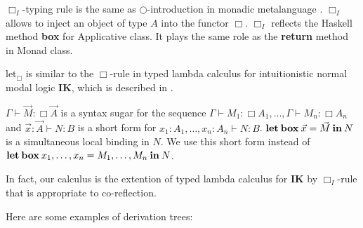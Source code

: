 \documentclass[a4paper]{article}
\begin{document}
  $\Box_I$-typing rule is the same as $\bigcirc$-introduction in monadic
  metalanguage \cite{Lax}. $\Box_I$ allows to inject an object of type $A$ into the functor $\Box$. $\Box_I$ reflects the
  Haskell method {\bf box} for Applicative class. It plays the same role as the {\bf return} method in Monad class.

  $\text{let}_{\Box}$ is similar to the $\Box$-rule in typed lambda calculus for intuitionistic normal modal logic {\bf IK}, which is described in \cite{ModalK}.

$\Gamma \vdash \vec{M} : \Box \vec{A}$ is a syntax sugar for the sequence $\Gamma \vdash M_1 : \Box A_1,\dots,\Gamma \vdash M_n : \Box A_n$ and $\vec{x} : \vec{A} \vdash N : B$ is a short form for $x_1 : A_1, \dots, x_n : A_n \vdash N : B$.
${\bf let \: box \:} \vec{x} = \vec{M} {\: \bf in \: } N$ is a simultaneous local binding in $N$.
We use this short form instead of ${\bf let \: box \:} x_1,\dots,x_n = M_1,\dots,M_n {\: \bf in \:} N$.

In fact, our calculus is the extention of typed lambda calculus for {\bf IK} by $\Box_I$-rule that is appropriate to co-reflection.

  \vspace{\baselineskip}

Here are some examples of derivation trees:

\begin{prooftree}
\end{prooftree}

\begin{prooftree}
\end{prooftree}

  \vspace{\baselineskip}
\end{document}
